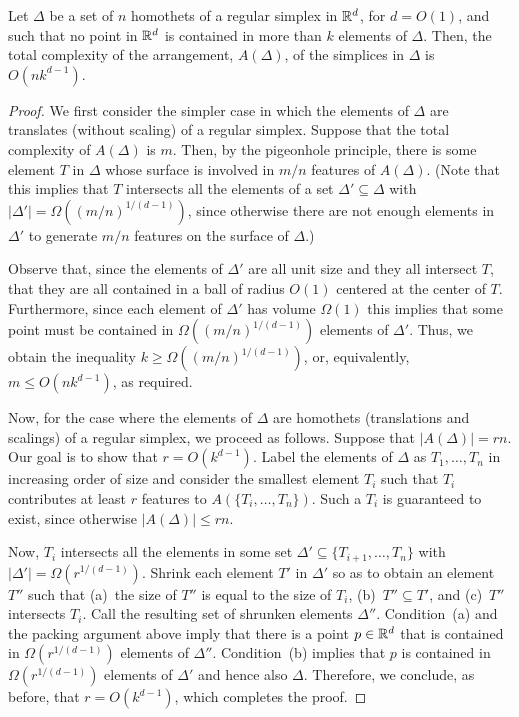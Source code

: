 \documentclass[lotsofwhite]{patmorin}
\begin{document}
\begin{lem}
  Let $\Delta$ be a set of $n$ homothets of a regular simplex in $\mathbb{R}^d$,
  for $d=O(1)$, and such that no point in $\mathbb{R}^d$ is contained in more
  than $k$ elements of $\Delta$.  Then, the total complexity of the
  arrangement, $A(\Delta)$, of the simplices in $\Delta$ is $O(nk^{d-1})$.
\end{lem}

\begin{proof}
  We first consider the simpler case in which the elements of $\Delta$
  are translates (without scaling) of a regular simplex.  Suppose that
  the total complexity of $A(\Delta)$ is $m$.  Then, by the pigeonhole
  principle, there is some element $T$ in $\Delta$ whose surface is involved
  in $m/n$ features of $A(\Delta)$.  (Note that this implies that $T$
  intersects all the elements of a set $\Delta'\subseteq\Delta$ with
  $|\Delta'|=\Omega((m/n)^{1/(d-1)})$, since otherwise there are not
  enough elements in $\Delta'$ to generate $m/n$ features on the surface
  of $\Delta$.)

  Observe that, since the elements of $\Delta'$ are all unit size and
  they all intersect $T$, that they are all contained in a ball of
  radius $O(1)$ centered at the center of $T$.  Furthermore, since each
  element of $\Delta'$ has volume $\Omega(1)$ this implies that some point
  must be contained in $\Omega((m/n)^{1/(d-1)})$ elements of $\Delta'$.
  Thus, we obtain the inequality $k \ge \Omega((m/n)^{1/(d-1)})$, or,
  equivalently, $m \le O(nk^{d-1})$, as required.

  Now, for the case where the elements of $\Delta$ are homothets
  (translations and scalings) of a regular simplex, we proceed as follows.
  Suppose that $|A(\Delta)| = rn$.  Our goal is to show that $r=O(k^{d-1})$.
  Label the elements of $\Delta$ as $T_1,\ldots,T_n$ in increasing
  order of size and consider the smallest element $T_i$ such that $T_i$
  contributes at least $r$ features to $A(\{T_i,\ldots,T_n\})$.  Such a
  $T_i$ is guaranteed to exist, since otherwise $|A(\Delta)|\le rn$.

  Now, $T_i$ intersects all the elements in some set $\Delta'\subseteq
  \{T_{i+1},\ldots,T_n\}$ with $|\Delta'| = \Omega(r^{1/(d-1)})$.
  Shrink each element $T'$ in $\Delta'$ so as to obtain an element
  $T''$ such that (a)~the size of $T''$ is equal to the size of $T_i$,
  (b)~$T'' \subseteq T'$, and (c)~$T''$ intersects $T_i$.  
  Call the resulting set of shrunken elements
  $\Delta''$.  Condition~(a) and the packing argument above imply that
  there is a point $p\in\mathbb{R}^d$ that is contained in $\Omega(r^{1/(d-1)})$
  elements of $\Delta''$.  Condition~(b) implies that $p$ is contained in
  $\Omega(r^{1/(d-1)})$ elements of $\Delta'$ and hence also $\Delta$.
  Therefore, we conclude, as before, that $r = O(k^{d-1})$, which completes the proof.
\end{proof}
\end{document}
